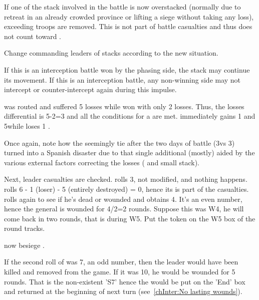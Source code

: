 If one of the stack involved in the battle is now overstacked (normally due to
retreat in an already crowded province or lifting a siege without taking any
loss), exceeding troops are removed. This is not part of battle casualties and
thus does not count toward .

Change commanding leaders of stacks according to the new situation.

If this is an interception battle won by the phasing side, the stack may
continue its movement. If this is an interception battle, any non-winning side
may not intercept or counter-intercept again during this impulse.

\begin{exemple}
  \HIS was routed and suffered 5 losses while \FRA won with only 2
  losses. Thus, the losses differential is 5-2=3 and all the conditions for a
   are met. \FRA immediately gains 1 \STAB and 5\VPs while
  \HIS loses 1 \STAB.

  Once again, note how the seemingly tie after the two days of battle
  (3\textetoile\textetoile\textetoile vs 3\textetoile\textetoile) turned into a
  Spanish disaster due to that single additional \textetoile (mostly) aided by
  the various external factors correcting the losses ( and small stack).

  Next, leader casualties are checked. \FRA rolls 3, not modified, and nothing
  happens. \HIS rolls 6 - 1 (loser) - 5 (entirely destroyed) = 0, hence its
  \LeaderG is part of the casualties. \HIS rolls again to see if he's dead or
  wounded and obtains 4. It's an even number, hence the general is wounded for
  4/2=2 rounds. Suppose this was W4, he will come back in two rounds, that is
  during W5. Put the token on the W5 box of the round tracks.

  \FRA now besiege \villeArras.

  \smallskip

  If the second roll of \HIS was 7, an odd number, then the leader would have
  been killed and removed from the game. If it was 10, he would be wounded for
  5 rounds. That is the non-existent 'S7' hence the \LeaderG would be put on
  the 'End' box and returned at the beginning of next turn
  (see~\ref{chInter:No lasting wounds}).
\end{exemple}

